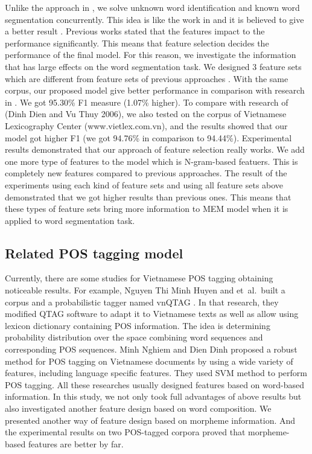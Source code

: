 \documentclass[english]{jnlp_1.4}
\begin{document}
Unlike the approach in \cite{Dien06}, we solve unknown word identification and known word segmentation concurrently.
This idea is like the work in \cite{CamTu07} and it is believed to give a better result \cite{Gao05}.
Previous works stated that the features impact to the performance significantly.
This means that feature selection decides the performance of the final model.
For this reason, we investigate the information that has large effects on the word segmentation task.
We designed 3 feature sets which are different from feature sets of previous approaches \cite{Dien06} \cite{CamTu07}. With the same corpus, our proposed model give better performance in comparison with research in \cite{CamTu07}. We got 95.30\% F1 measure (1.07\% higher). To compare with research of (Dinh Dien and Vu Thuy 2006), we also tested on the corpus of Vietnamese Lexicography Center (www.vietlex.com.vn), and the results showed that our model got higher F1 (we got 94.76\% in comparison to 94.44\%).
Experimental results demonstrated that our approach of feature selection really works.
We add one more type of features to the model which is N-gram-based featuers.
This is completely new features compared to previous approaches.
The result of the experiments using each kind of feature sets and using all feature sets above demonstrated that we got higher results than previous ones. This means that these types of feature sets bring more
information to MEM model when it is applied to word segmentation task.


\subsection{Related POS tagging model}

Currently, there are some studies for Vietnamese POS tagging obtaining noticeable results.
For example, Nguyen Thi Minh Huyen and et~al.\ built a corpus and a probabilistic tagger named vnQTAG \cite{Huyen03}.
In that research, they modified QTAG software to adapt it to Vietnamese texts as well as allow using lexicon dictionary containing POS information. The idea is determining probability distribution over the space combining word sequences and corresponding POS sequences. Minh Nghiem and Dien Dinh \cite{Minh08} proposed a robust method for POS tagging on Vietnamese documents by using a wide variety of features, including language specific features. They used SVM method to perform POS tagging. All these researches usually designed features based on word-based information.
	In this study, we not only took full advantages of above results but also investigated another feature design based on word composition. We presented another way of feature design based on morpheme information. And the experimental results on two POS-tagged corpora proved that morpheme-based features are better by far.
\end{document}
